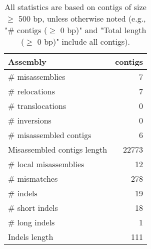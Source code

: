\documentclass[12pt,a4paper]{article}
\begin{document}
\begin{table}[ht]
\begin{center}
\caption{All statistics are based on contigs of size $\geq$ 500 bp, unless otherwise noted (e.g., "\# contigs ($\geq$ 0 bp)" and "Total length ($\geq$ 0 bp)" include all contigs).}
\begin{tabular}{|l*{1}{|r}|}
\hline
Assembly & contigs \\ \hline
\# misassemblies & 7 \\ \hline
\hspace{5mm}\# relocations & 7 \\ \hline
\hspace{5mm}\# translocations & 0 \\ \hline
\hspace{5mm}\# inversions & 0 \\ \hline
\# misassembled contigs & 6 \\ \hline
Misassembled contigs length & 22773 \\ \hline
\# local misassemblies & 12 \\ \hline
\# mismatches & 278 \\ \hline
\# indels & 19 \\ \hline
\hspace{5mm}\# short indels & 18 \\ \hline
\hspace{5mm}\# long indels & 1 \\ \hline
Indels length & 111 \\ \hline
\end{tabular}
\end{center}
\end{table}
\end{document}
